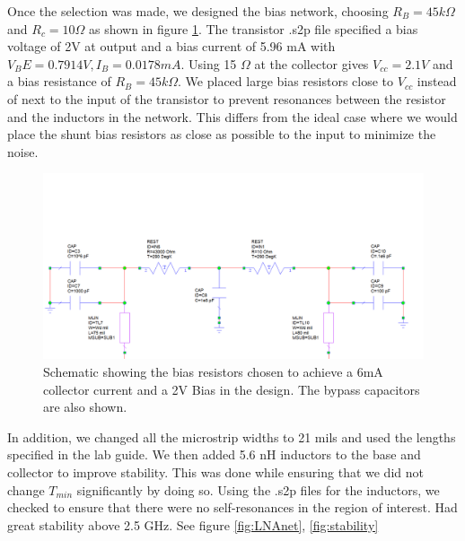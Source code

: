 \documentclass[twocolumn, aps, apl]{revtex4-1}
\begin{document}
Once the selection was made, we designed the bias network, choosing $R_B = 45 k \Omega$ and $R_c = 10 \Omega$ as shown in figure \ref{fig:dcnet}. The transistor .s2p file specified a bias voltage of 2V at output and a bias current of 5.96 mA with $V_BE = 0.7914 V, I_B = 0.0178 mA$. Using 15 $\Omega$ at the collector gives $V_{cc} = 2.1 V$ and a bias resistance of $R_B = 45 k \Omega$. We placed large bias resistors close to $V_{cc}$ instead of next to the input of the transistor to prevent resonances between the resistor and the inductors in the network. This differs from the ideal case where we would place the shunt bias resistors as close as possible to the input to minimize the noise.

    \begin{figure}[!htbp]
        \centering
        \includegraphics[scale=0.35]{dc_net.png}
        \caption{Schematic showing the bias resistors chosen to achieve a 6mA collector current and a 2V Bias in the design. The bypass capacitors are also shown.}
        \label{fig:dcnet}
    \end{figure}

In addition, we changed all the microstrip widths to 21 mils and used the lengths specified in the lab guide. We then added 5.6 nH inductors to the base and collector to improve stability. This was done while ensuring that we did not change $T_{min}$ significantly by doing so. Using the .s2p files for the inductors, we checked to ensure that there were no self-resonances in the region of interest. Had great stability above 2.5 GHz. See figure \ref{fig:LNAnet}, \ref{fig:stability}
\end{document}
